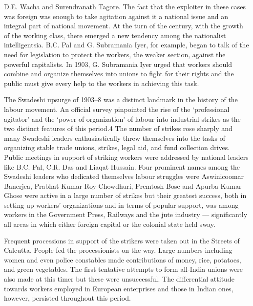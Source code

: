 D.E. Wacha and Surendranath Tagore. The fact that the exploiter in these cases was foreign was enough to take agitation against it a national issue and an integral part of national movement. At the turn of the century, with the growth of the working class, there emerged a new tendency among the nationalist intelligentsia. B.C. Pal and G. Subramania Iyer, for example, began to talk of the need for legislation to protect the workers, the weaker section, against the powerful capitalists. In 1903, G. Subramania Iyer urged that workers should combine and organize themselves into unions to fight for their rights and the public must give every help to the workers in achieving this task.

The Swadeshi upsurge of 1903--8 was a distinct landmark in the history of the labour movement. An official survey pinpointed the rise of the `professional agitator' and the `power of organization' of labour into industrial strikes as the two distinct features of this period.4 The number of strikes rose sharply and many Swadeshi leaders enthusiastically threw themselves into the tasks of organizing stable trade unions, strikes, legal aid, and fund collection drives. Public meetings in support of striking workers were addressed by national leaders like B.C. Pal, C.R. Das and Liaqat Hussain. Four prominent names among the Swadeshi leaders who dedicated themselves labour struggles were Aswinicoomar Banerjea, Prabhat Kumar Roy Chowdhuri, Premtosh Bose and Apurba Kumar Ghose were active in a large number of strikes but their greatest success, both in setting up workers' organizations and in terms of popular support, was among workers in the Government Press, Railways and the jute industry --- significantly all areas in which either foreign capital or the colonial state held sway.

Frequent processions in support of the strikers were taken out in the Streets of Calcutta. People fed the processionists on the way. Large numbers including women and even police constables made contributions of money, rice, potatoes, and green vegetables. The first tentative attempts to form all-India unions were also made at this timer but these were unsuccessful. The differential attitude towards workers employed in European enterprises and those in Indian ones, however, persisted throughout this period.

